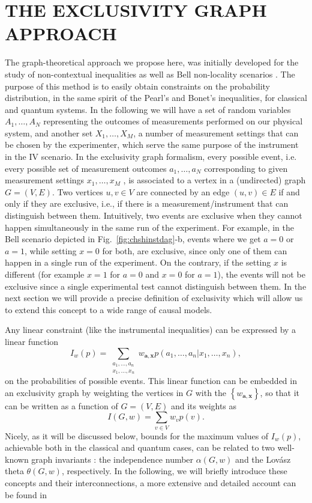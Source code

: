 \documentclass[letterpaper]{article}
\begin{document}
\section{THE EXCLUSIVITY GRAPH APPROACH}
The graph-theoretical approach we propose here, was initially developed
for the study of non-contextual inequalities \cite{cabello2014} as well
as Bell non-locality scenarios \cite{acin2015}.  The purpose of this
method is to easily obtain constraints on the probability distribution,
in the same spirit of the Pearl's and Bonet's inequalities, for classical
and quantum systems. In the following we will have a set of random
variables $A_1,\ldots,A_N$ representing the outcomes of measurements
performed on our physical system, and another set $X_1,\ldots,X_M$, a
number of measurement settings that can be chosen by the experimenter,
which serve the same purpose of the instrument in the IV scenario. In the
exclusivity graph formalism, every possible event, i.e. every possible
set of measurement outcomes $a_1,\ldots, a_N$ corresponding to given
measurement settings $x_1,\ldots,x_M$ , is associated to a vertex
in a (undirected) graph $G = (V, E)$.  Two vertices $u, v \in V$ are
connected by an edge $(u,v) \in E$ if and only if they are exclusive,
i.e., if there is a measurement/instrument that can distinguish between
them.  Intuitively, two events are exclusive when they cannot happen
simultaneously in the same run of the experiment.  For example, in the
Bell scenario depicted in Fig.~\ref{fig:chshinstdag}-b, events where we
get $a = 0$ or $a = 1$, while setting $x = 0$ for both, are exclusive,
since only one of them can happen in a single run of the experiment. On
the contrary, if the setting $x$ is different (for example $x = 1$ for
$a=0$ and $x = 0$ for $a=1$), the events will not be exclusive since a
single experimental test cannot distinguish between them. In the next
section we will provide a precise definition of exclusivity which will
allow us to extend this concept to a wide range of causal models.

Any linear constraint (like the instrumental inequalities) can be
expressed by a linear function
\begin{equation}
    I_w(p) = \sum_{\substack{a_1,\ldots,a_n\\x_1,\ldots,x_n}}
w_{\mathbf{a}, \mathbf{x}} p(a_1,\ldots,a_n|x_1,\ldots,x_n),
\end{equation}
on the probabilities of possible events. This linear function can be
embedded in an exclusivity graph by weighting the vertices in $G$ with
the $\left\{w_{\mathbf{a}, \mathbf{x}}\right\}$, so that it can be written
as a function of $G = (V, E)$ and its weights as
\begin{equation}
    I(G,w) = \sum_{v \in V}w_v p(v).
    \label{eq:linconstG}
\end{equation}
Nicely, as it will be discussed below, bounds for the maximum values
of $I_w(p)$, achievable both in the classical and quantum cases, can
be related to two well-known graph invariants \cite{cabello2014}: the
independence number $\alpha(G, w)$ and the Lovász theta $\theta(G, w)$,
respectively. In the following, we will briefly introduce these concepts
and their interconnections, a more extensive and detailed account can
be found in \cite{cabello2014,rabelo2014,acin2015}
\end{document}
